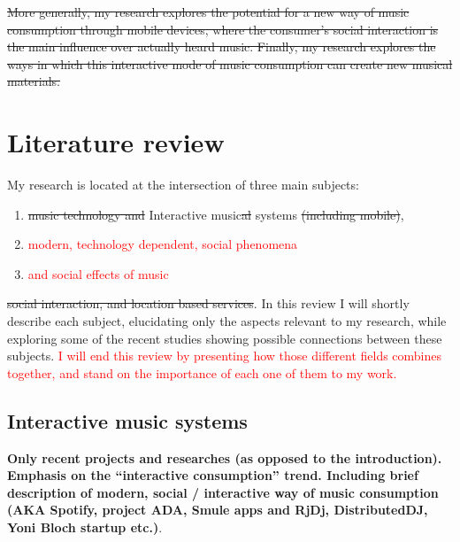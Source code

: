 \documentclass[a4paper,11pt]{article}
\begin{document}
\st{More generally, my research explores the potential for a new way of music consumption through mobile devices, where the consumer's social interaction is the main influence over actually heard music. Finally, my research explores the ways in which this interactive mode of music consumption can create new musical materials.}\\


\section{Literature review}

My research is located at the intersection of three main subjects:

\begin{enumerate}

	\item \st{music technology and} Interactive music\st{al} systems\st{ (including mobile)},

	\item \textcolor{red}{modern, technology dependent, social phenomena}

	\item \textcolor{red}{and social effects of music}

\end{enumerate}

\st{social interaction, and location based services}. In this review I will shortly describe each subject, elucidating only the aspects relevant to my research, while exploring some of the recent studies showing possible connections between these subjects. \textcolor{red}{I will end this review by presenting how those different fields combines together, and stand on the importance of each one of them to my work.}\\


\subsection{Interactive music systems}

\textbf{Only recent projects and researches (as opposed to the introduction). Emphasis on the {``}interactive consumption'' trend. Including brief description of modern, social / interactive way of music consumption (AKA Spotify, project ADA, Smule apps and RjDj, DistributedDJ, Yoni Bloch startup etc.)}.\\
\end{document}
